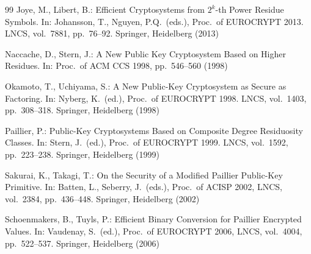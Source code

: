 \documentclass[11pt,a4paper]{article}
\theoremstyle{remark}
\begin{document}
\begin{thebibliography}{99}
Joye, M., Libert, B.: Efficient Cryptosystems from $2^k$-th Power Residue Symbols. In: Johansson, T., Nguyen, P.Q.\ (eds.), Proc.\ of EUROCRYPT 2013. LNCS, vol.~7881, pp.~76--92. Springer, Heidelberg (2013)

Naccache, D., Stern, J.: A New Public Key Cryptosystem Based on Higher Residues. In: Proc.\ of ACM CCS 1998, pp.~546--560 (1998)

Okamoto, T., Uchiyama, S.: A New Public-Key Cryptosystem as Secure as Factoring. In: Nyberg, K.\ (ed.), Proc.\ of EUROCRYPT 1998. LNCS, vol.~1403, pp.~308--318. Springer, Heidelberg (1998)

Paillier, P.: Public-Key Cryptosystems Based on Composite Degree Residuosity Classes. In: Stern, J.\ (ed.), Proc.\ of EUROCRYPT 1999. LNCS, vol.~1592, pp.~223--238. Springer, Heidelberg (1999)

Sakurai, K., Takagi, T.: On the Security of a Modified Paillier Public-Key Primitive. In: Batten, L., Seberry, J.\ (eds.), Proc.\ of ACISP 2002, LNCS, vol.~2384, pp.~436--448. Springer, Heidelberg (2002)

Schoenmakers, B., Tuyls, P.: Efficient Binary Conversion for Paillier Encrypted Values. In: Vaudenay, S.\ (ed.), Proc.\ of EUROCRYPT 2006, LNCS, vol.~4004, pp.~522--537. Springer, Heidelberg (2006)

\end{thebibliography}
\end{document}
